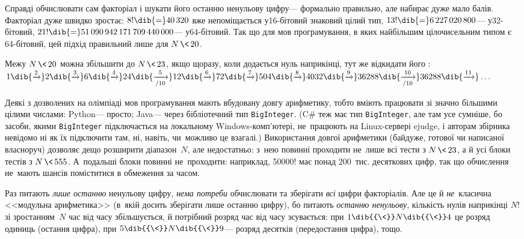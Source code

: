 \Tutorial %
Справді обчислювати сам факторіал і шукати його останню ненульо\-ву цифру\nolinebreak[3] --- формально правильно, але набирає дуже мало балів. Факторіал дуже швидко зростає: $8!\dib{{=}}40\,320$ вже не\nolinebreak[3] поміщається у\nolinebreak[3] \mbox{16-бі}\-то\-вий знаковий цілий тип, $13!\dib{{=}}6\,227\,020\,800$\nolinebreak[3] --- у\nolinebreak[3] \mbox{32-бі}\-то\-вий,
$21!\dib{{=}}51\,090\,942\,171\,709\,440\,000$\nolinebreak[3] --- у\nolinebreak[3] \mbox{64-бі}\-то\-вий. Так що для мов програмування, в яких найбільшим цілочисельним типом є \mbox{64-бі}\-то\-вий, цей підхід правильний лише для ${N\,{\<}\,20}$.

Межу ${N\,{\<}\,20}$ можна збільшити до ${N\,{\<}\,23}$, якщо 
щоразу, коли додається
нуль наприкінці, тут же відкидати його%
: $1
\dib{{\xrightarrow{\*2}}}2
\dib{{\xrightarrow{\*3}}}6
\dib{{\xrightarrow{\*4}}}24
\dib{{\xrightarrow[/10]{\*5}}}12
\dib{{\xrightarrow{\*6}}}72
\dib{{\xrightarrow{\*7}}}504
\dib{{\xrightarrow{\*8}}}4032
\dib{{\xrightarrow{\*9}}}36288
\dib{{\xrightarrow[/10]{\*10}}}36288
\dib{{\xrightarrow{\*11}}}\dots$

Деякі з дозволених на олімпіаді мов програмування мають вбудовану довгу арифметику, тобто вміють працювати зі значно більшими цілими числами: Python\nolinebreak[3] --- просто; Java\nolinebreak[3] --- через бібліотечний тип \texttt{BigInteger}. (C\# теж має тип \texttt{BigInteger}, але там усе сумніше, бо засоби, якими \texttt{BigInteger} підключається на локальному Windows-комп'ютері, не~працюють на Linux-сервері ejudge, і авторам збірника невідомо ні як їх підключити там, ні, навіть, чи~можливо це взагалі.) Використання довгої арифметики (байдуже, готової чи написаної власноруч) дозволяє дещо розширити діапазон~$N$, але недостатньо: з~нею повинні проходити не~лише всі тести з $N\,{\<}\,23$, а й усі блоки тестів з $N\,{\<}\,555$. А~подальші блоки повинні не~проходити: наприклад, 50000! має понад 200~тис. десяткових цифр, так що обчислення не~мають шансів поміститися в обмеження за часом.

Раз питають \emph{лише останню} ненульову цифру, \emph{нема потреби} обчислювати та зберігати \emph{всі} цифри факторіалів. 
Але це й 
\emph{не}~класична <<модульна арифметика>> (в~якій досить зберігати %
лише останню цифру), бо питають \emph{останню ненульову}, кількість нулів наприкінці $N!$ зі зростанням~$N$ час від часу збільшується, 
й потрібний розряд час від часу зсувається: 
при $1\dib{{\<}}N\dib{{\<}}4$ це розряд одиниць (остання цифра),
при $5\dib{{\<}}N\dib{{\<}}9$\nolinebreak[3] --- розряд десятків (передостання цифра), тощо.


